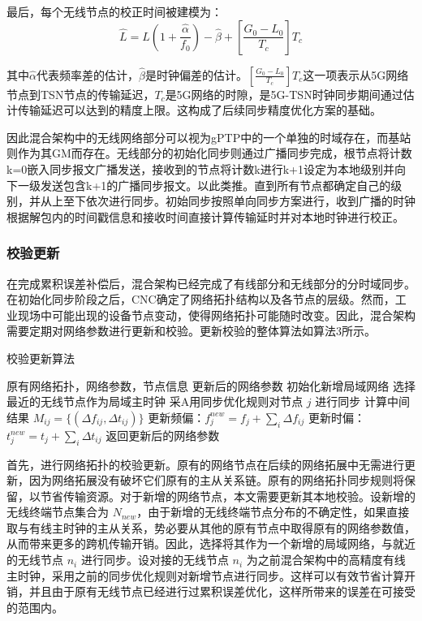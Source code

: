 \documentclass[UTF8,a4paper,12pt]{ctexart}
\numberwithin{equation}{section}
\begin{document}
	最后，每个无线节点的校正时间被建模为：
	\begin{equation}
		\widehat{L}=L\left(1+\frac{\widehat{\alpha}}{f_0}\right)-\widehat{\beta}+\left[\frac{G_0-L_0}{T_c}\right] T_c
	\end{equation}
	
	其中$\widehat{\alpha}$代表频率差的估计，$\widehat{\beta}$是时钟偏差的估计。$[\frac{G_0-L_0}{T_c}]T_c$这一项表示从5G网络节点到TSN节点的传输延迟，$T_c$是5G网络的时隙，是5G-TSN时钟同步期间通过估计传输延迟可以达到的精度上限。这构成了后续同步精度优化方案的基础。
	
	因此混合架构中的无线网络部分可以视为gPTP中的一个单独的时域存在，而基站则作为其GM而存在。无线部分的初始化同步则通过广播同步完成，根节点将计数k=0嵌入同步报文广播发送，接收到的节点将计数k进行k+1设定为本地级别并向下一级发送包含k+1的广播同步报文。以此类推。直到所有节点都确定自己的级别，并从上至下依次进行同步。初始同步按照单向同步方案进行，收到广播的时钟根据解包内的时间戳信息和接收时间直接计算传输延时并对本地时钟进行校正。
	
	\subsubsection{校验更新}
	在完成累积误差补偿后，混合架构已经完成了有线部分和无线部分的分时域同步。在初始化同步阶段之后，CNC确定了网络拓扑结构以及各节点的层级。然而，工业现场中可能出现的设备节点变动，使得网络拓扑可能随时改变。因此，混合架构需要定期对网络参数进行更新和校验。更新校验的整体算法如算法3所示。
	\begin{algorithm}
		\caption{校验更新算法}
		\begin{algorithmic}[1]
			\REQUIRE
			原有网络拓扑，网络参数，节点信息
			\ENSURE
			更新后的网络参数
			\STATE 初始化新增局域网络
			\STATE 选择最近的无线节点作为局域主时钟
			\STATE 采A用同步优化规则对节点 $j$ 进行同步
			\ENDFOR
			\STATE 计算中间结果 $M_{ij} = \{(\Delta f_{ij}, \Delta t_{ij})\}$
			\STATE 更新频偏：$f_j^{new} = f_j + \sum_{i} \Delta f_{ij}$
			\STATE 更新时偏：$t_j^{new} = t_j + \sum_{i} \Delta t_{ij}$
			\ENDFOR
			\STATE 返回更新后的网络参数
		\end{algorithmic}
	\end{algorithm}
	首先，进行网络拓扑的校验更新。原有的网络节点在后续的网络拓展中无需进行更新，因为网络拓展没有破坏它们原有的主从关系链。原有的网络拓扑同步规则将保留，以节省传输资源。对于新增的网络节点，本文需要更新其本地校验。设新增的无线终端节点集合为 $N_{new}$，由于新增的无线终端节点分布的不确定性，如果直接取与有线主时钟的主从关系，势必要从其他的原有节点中取得原有的网络参数值，从而带来更多的跨机传输开销。因此，选择将其作为一个新增的局域网络，与就近的无线节点 $n_i$ 进行同步。设对接的无线节点 $n_i$ 为之前混合架构中的高精度有线主时钟，采用之前的同步优化规则对新增节点进行同步。这样可以有效节省计算开销，并且由于原有无线节点已经进行过累积误差优化，这样所带来的误差在可接受的范围内。
	
\end{document}
